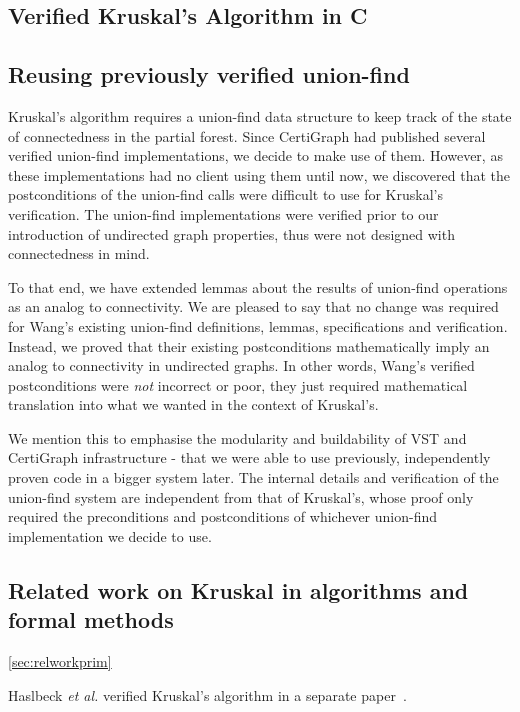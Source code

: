 \subsection{Verified Kruskal's Algorithm in C}
\label{sec:kruskal}

\subsection{Reusing previously verified union-find} %
Kruskal's algorithm requires a union-find data structure to keep track of the state of connectedness in the partial forest. Since CertiGraph had published several verified union-find implementations, we decide to make use of them. However, as these implementations had no client using them until now, we discovered that the postconditions of the union-find calls were difficult to use for Kruskal's verification. The union-find implementations were verified prior to our introduction of undirected graph properties, thus were not designed with connectedness in mind.

To that end, we have extended lemmas about the results of union-find operations as an analog to connectivity. We are pleased to say that no change was required for Wang's existing union-find definitions, lemmas, specifications and verification. Instead, we proved that their existing postconditions mathematically imply an analog to connectivity in undirected graphs. In other words, Wang's verified postconditions were \textit{not} incorrect or poor, they just required mathematical translation into what we wanted in the context of Kruskal's.

We mention this to emphasise the modularity and buildability of VST and CertiGraph infrastructure - that we were able to use previously, independently proven code in a bigger system later. The internal details and verification of the union-find system are independent from that of Kruskal's, whose proof only required the preconditions and postconditions of whichever union-find implementation we decide to use.

\subsection{Related work on Kruskal in algorithms and formal methods}
\ref{sec:relworkprim}

Haslbeck \emph{et al.} verified Kruskal's algorithm in a separate paper~\cite{DBLP:journals/afp/HaslbeckLB19}.

